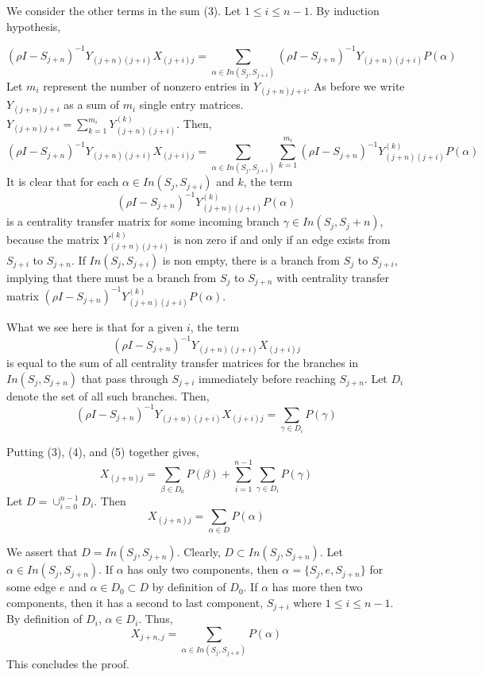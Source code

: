 \documentclass{paper}
\begin{document}
We consider the other terms in the sum (3). Let $1 \leq i \leq n-1$. By induction hypothesis,

\[
(\rho I - S_{j+n})^{-1}Y_{(j+n)(j+i)}X_{(j+i)j} = \sum_{\alpha \in In(S_j,S_{j+i})}(\rho I - S_{j+n})^{-1}Y_{(j+n)(j+i)} P(\alpha )
\]
Let $m_i$ represent the number of nonzero entries in $Y_{(j+n)j+i}$. As before we write $Y_{(j+n)j+i}$ as a sum of $m_i$ single entry matrices.
$Y_{(j+n)j+i} = \sum_{k=1}^{m_i} Y_{(j+n)(j+i)}^{(k)}$. Then,
\[
(\rho I - S_{j+n})^{-1}Y_{(j+n)(j+i)}X_{(j+i)j} = \sum_{\alpha \in In(S_j,S_{j+i})} \sum_{k=1}^{m_i}(\rho I - S_{j+n})^{-1}Y_{(j+n)(j+i)}^{(k)} P(\alpha )
\]
It is clear that for each $\alpha \in In(S_j,S_{j+i})$ and $k$, the term
\[
(\rho I - S_{j+n})^{-1}Y_{(j+n)(j+i)}^{(k)} P(\alpha )
\]
is a centrality transfer matrix for some incoming branch $\gamma \in In(S_j,S_j+n)$, because the matrix $Y_{(j+n)(j+i)}^{(k)}$ is non zero if and only if an edge exists from $S_{j+i}$ to $S_{j+n}$. If $In(S_j,S_{j+i})$ is non empty, there is a branch from $S_j$ to $S_{j+i}$, implying that there must be a branch from $S_j$ to $S_{j+n}$ with centrality transfer matrix $(\rho I - S_{j+n})^{-1}Y_{(j+n)(j+i)}^{(k)} P(\alpha )$.


What we see here is that for a given $i$, the term \[(\rho I - S_{j+n})^{-1}Y_{(j+n)(j+i)}X_{(j+i)j} \] is equal to the sum of all centrality transfer matrices for the branches in $In(S_j,S_{j+n})$ that pass through $S_{j+i}$ immediately before reaching $S_{j+n}$. Let $D_i$ denote the set of all such branches. Then,
\begin{equation}
(\rho I - S_{j+n})^{-1}Y_{(j+n)(j+i)}X_{(j+i)j} = \sum_{\gamma \in D_i} P(\gamma)
\end{equation}

Putting (3), (4), and (5) together gives,
\[
X_{(j+n)j} = \sum_{\beta \in D_0} P(\beta) + \sum_{i=1}^{n-1}\sum_{\gamma \in D_i}P(\gamma)
\]
Let $D = \cup_{i=0}^{n-1}D_i$. Then
\[
X_{(j+n)j} = \sum_{\alpha \in D}P(\alpha)
\]

We assert that $D = In(S_j,S_{j+n})$. Clearly, $D \subset In(S_j,S_{j+n})$. Let $\alpha \in In(S_j,S_{j+n})$. If $\alpha$ has only two components, then $\alpha = \{S_j,e,S_{j+n}\}$ for some edge $e$ and $\alpha \in D_0 \subset D$ by definition of $D_0$. If $\alpha$ has more then two components, then it has a second to last component, $S_{j+i}$ where $ 1 \leq i \leq n-1 $. By definition of $D_i$, $\alpha \in D_i$. Thus,
\[
X_{j+n,j} = \sum_{\alpha \in In(S_j,S_{j+n})}P(\alpha)
\]
This concludes the proof.
\end{document}
